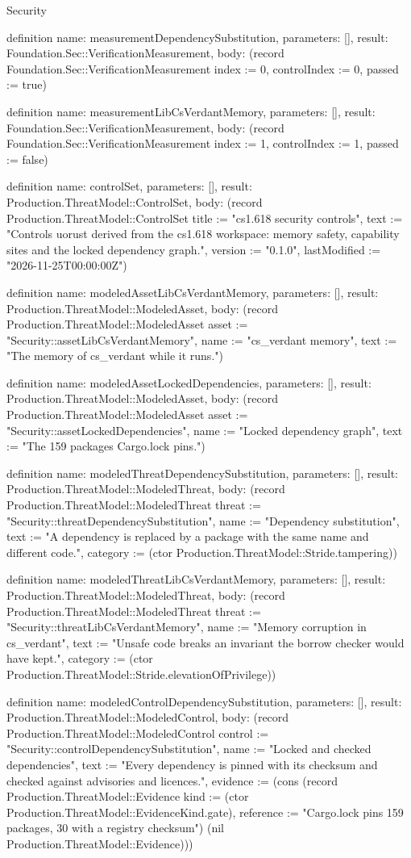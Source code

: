 \begin{lexlean}{Security}
\begin{semanticmodule}
definition{
  name: measurementDependencySubstitution,
  parameters: [],
  result: Foundation.Sec::VerificationMeasurement,
  body: (record Foundation.Sec::VerificationMeasurement {index := 0, controlIndex := 0, passed := true})
}

definition{
  name: measurementLibCsVerdantMemory,
  parameters: [],
  result: Foundation.Sec::VerificationMeasurement,
  body: (record Foundation.Sec::VerificationMeasurement {index := 1, controlIndex := 1, passed := false})
}

definition{
  name: controlSet,
  parameters: [],
  result: Production.ThreatModel::ControlSet,
  body: (record Production.ThreatModel::ControlSet {title := "cs1.618 security controls", text := "Controls uorust derived from the cs1.618 workspace: memory safety, capability sites and the locked dependency graph.", version := "0.1.0", lastModified := "2026-11-25T00:00:00Z"})
}

definition{
  name: modeledAssetLibCsVerdantMemory,
  parameters: [],
  result: Production.ThreatModel::ModeledAsset,
  body: (record Production.ThreatModel::ModeledAsset {asset := "Security::assetLibCsVerdantMemory", name := "cs_verdant memory", text := "The memory of cs_verdant while it runs."})
}

definition{
  name: modeledAssetLockedDependencies,
  parameters: [],
  result: Production.ThreatModel::ModeledAsset,
  body: (record Production.ThreatModel::ModeledAsset {asset := "Security::assetLockedDependencies", name := "Locked dependency graph", text := "The 159 packages Cargo.lock pins."})
}

definition{
  name: modeledThreatDependencySubstitution,
  parameters: [],
  result: Production.ThreatModel::ModeledThreat,
  body: (record Production.ThreatModel::ModeledThreat {threat := "Security::threatDependencySubstitution", name := "Dependency substitution", text := "A dependency is replaced by a package with the same name and different code.", category := (ctor Production.ThreatModel::Stride.tampering)})
}

definition{
  name: modeledThreatLibCsVerdantMemory,
  parameters: [],
  result: Production.ThreatModel::ModeledThreat,
  body: (record Production.ThreatModel::ModeledThreat {threat := "Security::threatLibCsVerdantMemory", name := "Memory corruption in cs_verdant", text := "Unsafe code breaks an invariant the borrow checker would have kept.", category := (ctor Production.ThreatModel::Stride.elevationOfPrivilege)})
}

definition{
  name: modeledControlDependencySubstitution,
  parameters: [],
  result: Production.ThreatModel::ModeledControl,
  body: (record Production.ThreatModel::ModeledControl {control := "Security::controlDependencySubstitution", name := "Locked and checked dependencies", text := "Every dependency is pinned with its checksum and checked against advisories and licences.", evidence := (cons (record Production.ThreatModel::Evidence {kind := (ctor Production.ThreatModel::EvidenceKind.gate), reference := "Cargo.lock pins 159 packages, 30 with a registry checksum"}) (nil Production.ThreatModel::Evidence))})
}


\end{semanticmodule}
\end{lexlean}
